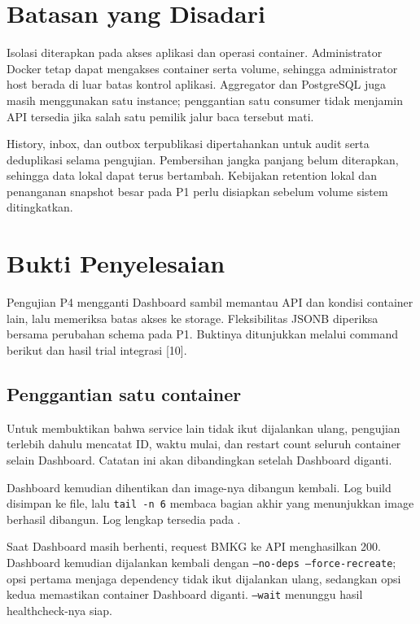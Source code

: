 \section{Batasan yang Disadari}
Isolasi diterapkan pada akses aplikasi dan operasi container. Administrator Docker tetap dapat mengakses container serta volume, sehingga administrator host berada di luar batas kontrol aplikasi. Aggregator dan PostgreSQL juga masih menggunakan satu instance; penggantian satu consumer tidak menjamin API tersedia jika salah satu pemilik jalur baca tersebut mati.

History, inbox, dan outbox terpublikasi dipertahankan untuk audit serta deduplikasi selama pengujian. Pembersihan jangka panjang belum diterapkan, sehingga data lokal dapat terus bertambah. Kebijakan retention lokal dan penanganan snapshot besar pada P1 perlu disiapkan sebelum volume sistem ditingkatkan.

\section{Bukti Penyelesaian}
Pengujian P4 mengganti Dashboard sambil memantau API dan kondisi container lain, lalu memeriksa batas akses ke storage. Fleksibilitas JSONB diperiksa bersama perubahan schema pada P1. Buktinya ditunjukkan melalui command berikut dan hasil trial integrasi [10].

\subsection{Penggantian satu container}
Untuk membuktikan bahwa service lain tidak ikut dijalankan ulang, pengujian terlebih dahulu mencatat ID, waktu mulai, dan restart count seluruh container selain Dashboard. Catatan ini akan dibandingkan setelah Dashboard diganti.

Dashboard kemudian dihentikan dan image-nya dibangun kembali. Log build disimpan ke file, lalu \texttt{tail -n 6} membaca bagian akhir yang menunjukkan image berhasil dibangun. Log lengkap tersedia pada .

Saat Dashboard masih berhenti, request BMKG ke API menghasilkan 200. Dashboard kemudian dijalankan kembali dengan \texttt{--no-deps --force-recreate}; opsi pertama menjaga dependency tidak ikut dijalankan ulang, sedangkan opsi kedua memastikan container Dashboard diganti. \texttt{--wait} menunggu hasil healthcheck-nya siap.

